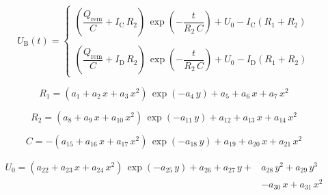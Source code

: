 \begin{center}
	\begin{equation} \label{eq:battery_voltage}
		U_\mathrm{B}\left(t\right) =
  		\begin{cases}
   			\left(\dfrac{Q_\mathrm{rem}}{C} + I_\mathrm{C} \, R_2\right) \, \exp \left( -\dfrac{t}{R_2 \, C} \right) + U_0 - I_\mathrm{C} \left( R_1 + R_2 \right) \\ \\
    		\left(\dfrac{Q_\mathrm{rem}}{C} + I_\mathrm{D} \, R_2\right) \, \exp \left( -\dfrac{t}{R_2 \, C} \right) + U_0 - I_\mathrm{D} \left( R_1 + R_2 \right)
  		\end{cases}
	\end{equation} 
\end{center}

\begin{center}
	\begin{equation} \label{eq:parameters_r_1}
		R_1 = \left( a_1 + a_2 \, x + a_3 \, x^2 \right) \, \exp\left( - a_4 \, y \right) + a_5 + a_6 \, x + a_7 \, x^2
	\end{equation} 
\end{center}

\begin{center}
	\begin{equation} \label{eq:parameters_r_2}
		R_2 = \left( a_8 + a_9 \, x + a_{10} \, x^2 \right) \, \exp\left( - a_{11} \, y \right) + a_{12} + a_{13} \, x + a_{14} \, x^2
	\end{equation} 
\end{center}

\begin{center}
	\begin{equation} \label{eq:parameters_c}
		C = - \left( a_{15} + a_{16} \, x + a_{17} \, x^2 \right) \, \exp\left( - a_{18} \, y \right) + a_{19} + a_{20} \, x + a_{21} \, x^2
	\end{equation} 
\end{center}

\begin{center}
	\begin{equation} \label{eq:parameters_u_0}
		\begin{aligned} 
		U_0 = \left( a_{22} + a_{23} \, x + a_{24} \, x^2 \right) \, \exp\left( - a_{25} \, y \right) + a_{26} + a_{27} \, y + &a_{28} \, y^2 + a_{29} \, y^3 \\ &- a_{30} \, x + a_{31} \, x^2
		\end{aligned}
	\end{equation} 
\end{center}

